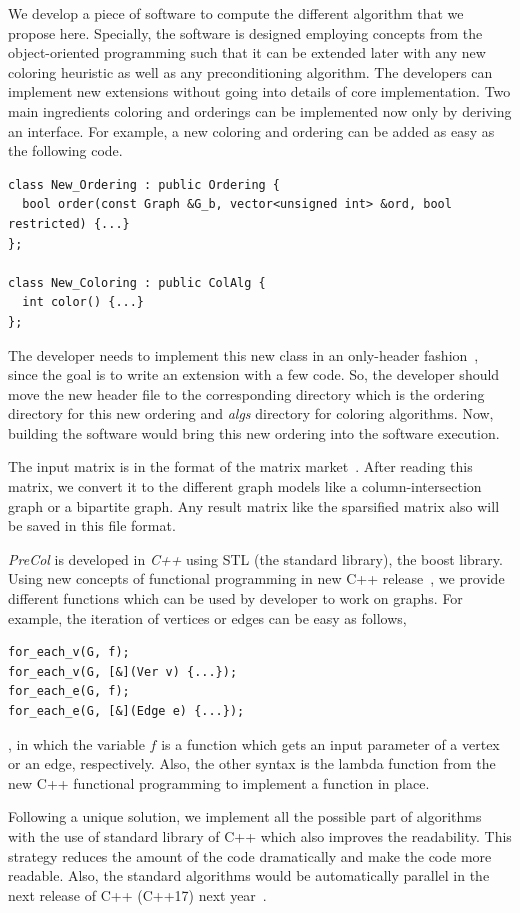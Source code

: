 \documentclass[12pt, twoside,a4paper,toc=bibliography]{scrbook}
\begin{document}
We develop a piece of software to compute the different algorithm that we propose here.
Specially, the software is designed employing concepts from the object-oriented programming
such that it can be extended later with any new coloring heuristic as well as any preconditioning algorithm.
The developers can implement new extensions without going into details of core implementation.
Two main ingredients coloring and orderings can be implemented now only by deriving an interface.
For example, a new coloring and ordering can be added as easy as the following code.
\begin{lstlisting}
class New_Ordering : public Ordering {
  bool order(const Graph &G_b, vector<unsigned int> &ord, bool restricted) {...}
};

class New_Coloring : public ColAlg {
  int color() {...}
};
\end{lstlisting}

The developer needs to implement this new class in an only-header fashion~\cite{headeronly},
since the goal is to write an extension with a few code. So, the developer should
move the new header file to the corresponding directory which is the ordering directory
for this new ordering and \textit{algs} directory for coloring algorithms.
Now, building the software would bring this new ordering into the software execution.

The input matrix is in the format of the matrix market~\cite{matrix-market}. 
After reading this matrix, we convert it to the different graph models 
like a column-intersection graph or a bipartite graph. 
Any result matrix like the sparsified matrix also will be saved in this file format.

\textit{PreCol} is developed in \textit{C++} using STL (the standard library),
the boost library\cite{boost}.
Using new concepts of functional programming
in new C++ release~\cite{Sutherland2015}, we provide different functions which can be used
by developer to work on graphs. For example, the iteration of vertices
or edges can be easy as follows,
\begin{lstlisting}
for_each_v(G, f);
for_each_v(G, [&](Ver v) {...});
for_each_e(G, f);
for_each_e(G, [&](Edge e) {...});
\end{lstlisting}
, in which the variable $f$ is a function which gets an input parameter
of a vertex or an edge, respectively.
Also, the other syntax is the lambda function
from the new C++ functional programming to implement a function in place.

Following a unique solution, we implement all the possible part of algorithms
with the use of standard library of C++ which also improves the readability.
This strategy reduces the amount of the code dramatically and
make the code more readable.
Also, the standard algorithms would be automatically parallel in the next
release of C++ (C++17) next year~\cite{parallelcpp}.
\end{document}
